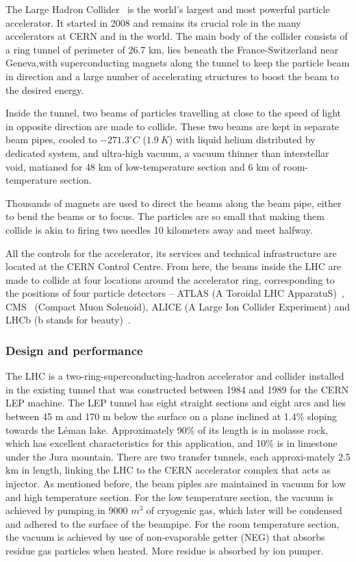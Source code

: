 \documentclass[letterpaper,12pt]{article}
\begin{document}
The Large Hadron Collider~\cite{Evans:2008zzb} is the world's 
largest and most powerful particle accelerator. 
It started in 2008 and remains its crucial role in the many 
accelerators at CERN and in the world.
The main body of the collider consists of a ring tunnel of 
perimeter of 26.7 km, lies beneath the France-Switzerland near
Geneva,with superconducting magnets along the tunnel to keep the 
particle beam in direction
 and a large number of accelerating structures to boost the 
 beam to the desired energy.

Inside the tunnel, two beams of particles travelling at close 
to the speed of light 
in opposite direction are made to collide. 
These two beams are kept in separate beam pipes,
cooled to $-271.3^\circ C$ ($1.9\ K$) with liquid 
helium distributed by dedicated system, 
 and ultra-high vacuum, a vacuum thinner than 
interstellar void, matianed for 48 km of low-temperature 
section and 6 km of room-temperature 
section. 

Thousands of magnets are used to direct the beams 
along the beam pipe, either to bend the beams or
to focus. The particles are so small that making them collide is akin to 
firing two needles 10 kilometers away and meet halfway. 

All the controls for the accelerator, its services and technical infrastructure 
are located at the CERN Control Centre. 
From here, the beams inside the LHC are made to collide 
at four locations around the accelerator ring, 
corresponding to the positions of four particle 
detectors – ATLAS (A Toroidal LHC ApparatuS)~\cite{PERF-2007-01}, 
CMS~\cite{CMS-2008xjf} (Compact Muon Solenoid), ALICE (A Large Ion Collider Experiment) 
\cite{ALICE-2008ngc} and LHCb (b stands for beauty)~\cite{LHCb-2008vvz}.


	\subsubsection{Design and performance}

	The LHC is a two-ring-superconducting-hadron accelerator and collider
	installed in the existing tunnel that was 
	constructed between 1984 and 1989 
	for the CERN LEP machine. The LEP tunnel has 
	eight straight sections and eight arcs 
	and lies between 45 m and 170 m below the 
	surface on a plane inclined at 1.4\% sloping towards the Léman lake.
	Approximately 90\% of its length is in molasse rock, 
	which has excellent characteristics for this application,
	and 10\% is in limestone under the Jura mountain. 
	There are two transfer tunnels, 
	each approxi-mately 2.5 km in length, linking the 
	LHC to the CERN accelerator complex that acts as injector.
	As mentioned before, the beam piples are maintained in 
	vacuum for low and high temperature section.
	For the low temperature section, the vacuum is achieved 
	by pumping in 9000 $m^3$ of cryogenic
	gas, which later will be condensed and adhered to the 
	surface of the beampipe. For the room temperature
	section, the vacuum is achieved by use of 
	non-evaporable getter (NEG) that absorbs residue gas particles 
	when heated. More residue is absorbed by ion pumper. 
	
\end{document}

